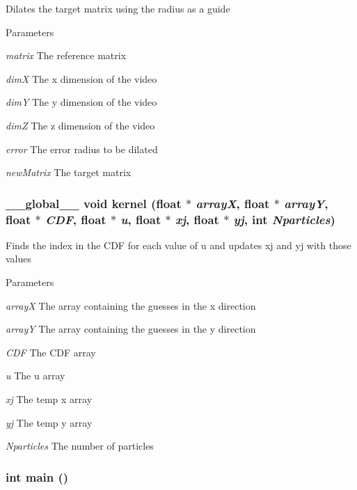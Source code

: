 \label{ex__particle__CUDA__naive_8cu_a707e839d9152f9bf820dee64c6627f5b}
Dilates the target matrix using the radius as a guide 
\begin{DoxyParams}{Parameters}
\item[{\em matrix}]The reference matrix \item[{\em dimX}]The x dimension of the video \item[{\em dimY}]The y dimension of the video \item[{\em dimZ}]The z dimension of the video \item[{\em error}]The error radius to be dilated \item[{\em newMatrix}]The target matrix \end{DoxyParams}
\hypertarget{ex__particle__CUDA__naive_8cu_a13c2e7691b5ac6748868aa438850e0b1}{
\subsubsection[{kernel}]{\setlength{\rightskip}{0pt plus 5cm}\_\-\_\-global\_\-\_\- void kernel (float $\ast$ {\em arrayX}, \/  float $\ast$ {\em arrayY}, \/  float $\ast$ {\em CDF}, \/  float $\ast$ {\em u}, \/  float $\ast$ {\em xj}, \/  float $\ast$ {\em yj}, \/  int {\em Nparticles})}}
\label{ex__particle__CUDA__naive_8cu_a13c2e7691b5ac6748868aa438850e0b1}
Finds the index in the CDF for each value of u and updates xj and yj with those values 
\begin{DoxyParams}{Parameters}
\item[{\em arrayX}]The array containing the guesses in the x direction \item[{\em arrayY}]The array containing the guesses in the y direction \item[{\em CDF}]The CDF array \item[{\em u}]The u array \item[{\em xj}]The temp x array \item[{\em yj}]The temp y array \item[{\em Nparticles}]The number of particles \end{DoxyParams}
\hypertarget{ex__particle__CUDA__naive_8cu_ae66f6b31b5ad750f1fe042a706a4e3d4}{
\subsubsection[{main}]{\setlength{\rightskip}{0pt plus 5cm}int main ()}}
